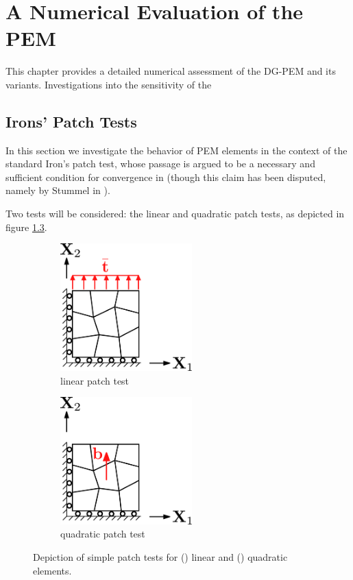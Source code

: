 \chapter{A Numerical Evaluation of the PEM} \label{ch:results}
%
This chapter provides a detailed numerical assessment of the DG-PEM and its variants. Investigations into the sensitivity of the 

\section{Irons' Patch Tests}

In this section we investigate the behavior of PEM elements in the context of the standard Iron's patch test, whose passage is argued to be a necessary and sufficient condition for convergence in \cite{Simo&Taylor:86} (though this claim has been disputed, namely by Stummel in \cite{Stummel:80}).

Two tests will be considered: the linear and quadratic patch tests, as depicted in figure \ref{fig:polygonal_patches}. 

\begin{figure}[!h]
    \centering
    \begin{subfigure}[b]{0.49\linewidth}
            \centering
            \includegraphics[width=2.0in]{figures/linear_patch_test.pdf}
    			\caption{linear patch test \label{fig:linear_patch_test}}
    \end{subfigure}
	\begin{subfigure}[b]{0.49\linewidth}
            \centering
            \includegraphics[width=2.0in]{figures/quadratic_patch_test.pdf}
    			\caption{quadratic patch test \label{fig:quadratic_patch_test}}
    \end{subfigure}
    \caption{Depiction of simple patch tests for () linear and () quadratic elements.}
    \label{fig:polygonal_patches}
\end{figure}

